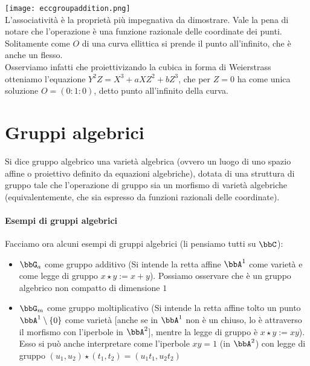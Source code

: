 \texttt{[image: eccgroupaddition.png]}\\
L'associatività è la proprietà più impegnativa da dimostrare. Vale la pena di notare che l'operazione è una funzione razionale delle coordinate dei punti.\\

Solitamente come $O$ di una curva ellittica si prende il punto all'infinito, che è anche un flesso.\\
Osserviamo infatti che proiettivizando la cubica in forma di Weierstrass otteniamo l'equazione $Y^2Z=X^3+aXZ^2+bZ^3$, che per $Z=0$ ha come unica soluzione $O=(0:1:0)$, detto punto all'infinito della curva.\\


\section{Gruppi algebrici}
\begin{definizione}
  Si dice gruppo algebrico una varietà algebrica (ovvero un luogo di uno spazio affine o proiettivo definito da equazioni algebriche), dotata di una struttura di gruppo tale che l'operazione di gruppo sia un morfismo di varietà algebriche (equivalentemente, che sia espresso da funzioni razionali delle coordinate).
\end{definizione}

\paragraph{Esempi di gruppi algebrici}
Facciamo ora alcuni esempi di gruppi algebrici (li pensiamo tutti su $\bbC$):
\begin{itemize}
\item $\bbG_a$ come gruppo additivo (Si intende la retta affine $\bbA^1$ come varietà e come legge di gruppo $x \star y := x + y$). Possiamo osservare che è un gruppo algebrico non compatto di dimensione $1$
\item $\bbG_m$ come gruppo moltiplicativo (Si intende la retta affine tolto un punto $\bbA^1 \setminus \{ 0 \}$ come varietà [anche se in $\bbA^1$ non è un chiuso, lo è attraverso il morfismo con l'iperbole in $\bbA^2$], mentre la legge di gruppo è $x \star y := x y$). \\
  Esso si può anche interpretare come l'iperbole $xy=1$ (in $\bbA^2$) con legge di gruppo $(u_1, u_2) \star (t_1, t_2) = (u_1 t_1, u_2 t_2)$
\end{itemize}

